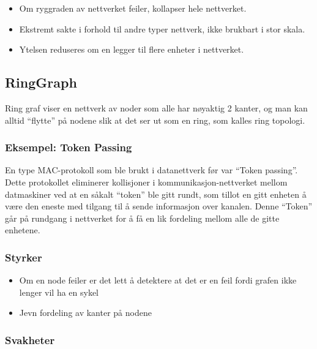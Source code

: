 \documentclass[11pt]{article}
\providecommand{\tightlist}{%
      \setlength{\itemsep}{0pt}\setlength{\parskip}{0pt}}
\begin{document}
\begin{itemize}
\tightlist
\item
  Om ryggraden av nettverket feiler, kollapser hele nettverket.
\item
  Ekstremt sakte i forhold til andre typer nettverk, ikke brukbart i
  stor skala.
\item
  Ytelsen reduseres om en legger til flere enheter i nettverket.
\end{itemize}

\hypertarget{ringgraph}{%
\subsection*{RingGraph}\label{ringgraph}}

Ring graf viser en nettverk av noder som alle har nøyaktig 2 kanter, og
man kan alltid ``flytte'' på nodene slik at det ser ut som en ring, som
kalles ring topologi.

\hypertarget{eksempel-token-passing}{%
\subsubsection*{Eksempel: Token Passing}\label{eksempel-token-passing}}

En type MAC-protokoll som ble brukt i datanettverk før var ``Token
passing''. Dette protokollet eliminerer kollisjoner i
kommunikasjon-nettverket mellom datmaskiner ved at en såkalt ``token''
ble gitt rundt, som tillot en gitt enheten å være den eneste med tilgang
til å sende informasjon over kanalen. Denne ``Token'' går på rundgang i
nettverket for å få en lik fordeling mellom alle de gitte enhetene.

\hypertarget{styrker-1}{%
\subsubsection*{Styrker}\label{styrker-1}}

\begin{itemize}
\tightlist
\item
  Om en node feiler er det lett å detektere at det er en feil fordi
  grafen ikke lenger vil ha en sykel
\item
  Jevn fordeling av kanter på nodene
\end{itemize}

\hypertarget{svakheter-1}{%
\subsubsection*{Svakheter}\label{svakheter-1}}
\end{document}
